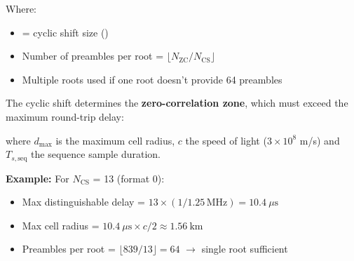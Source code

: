 
Where:

\begin{itemize}
\tightlist
\item
   = cyclic shift size ()
\item
  Number of preambles per root = $\lfloor N_{\mathrm{ZC}} / N_{\mathrm{CS}} \rfloor$
\item
  Multiple roots used if one root doesn’t provide 64 preambles
\end{itemize}


The cyclic shift  determines the \textbf{zero-correlation zone}, which must exceed the maximum round-trip delay:


where $d_{\max}$ is the maximum cell radius, $c$ the speed of light ($3 \times 10^{8}$ m/\allowbreak{}s) and $T_{s,\mathrm{seq}}$ the sequence sample duration.

\textbf{Example:} For \ensuremath{N_{\mathrm{CS}}} = 13 (format 0):

\begin{itemize}
\tightlist
\item
  Max distinguishable delay = $13 \times (1/1.25\,\mathrm{MHz}) = 10.4\ \mu\mathrm{s}$
\item
  Max cell radius = $10.4\ \mu\mathrm{s} \times c/2 \approx 1.56\ \mathrm{km}$
\item
  Preambles per root = $\lfloor 839/13 \rfloor = 64$ \ensuremath{\to} single root sufficient
\end{itemize}




\CNchained{}




\CNchained{}

